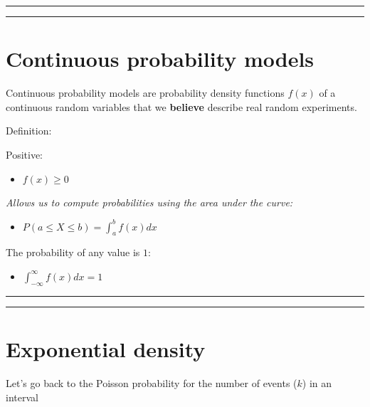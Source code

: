 \documentclass[
]{book}
\providecommand{\tightlist}{%
  \setlength{\itemsep}{0pt}\setlength{\parskip}{0pt}}
\begin{document}
\begin{center}\rule{0.5\linewidth}{0.5pt}\end{center}

\begin{center}\rule{0.5\linewidth}{0.5pt}\end{center}

\hypertarget{continuous-probability-models}{%
\section{Continuous probability models}\label{continuous-probability-models}}

Continuous probability models are probability density functions \(f(x)\) of a continuous random variables that we \textbf{believe} describe real random experiments.

Definition:

Positive:

\begin{itemize}
\tightlist
\item
  \(f(x) \geq 0\)
\end{itemize}

\emph{Allows us to compute probabilities using the area under the curve:}

\begin{itemize}
\tightlist
\item
  \(P(a\leq X \leq b)=\int_{a}^{b} f(x) dx\)
\end{itemize}

The probability of any value is \(1\):

\begin{itemize}
\tightlist
\item
  \(\int_{-\infty}^{\infty} f(x) dx = 1\)
\end{itemize}

\begin{center}\rule{0.5\linewidth}{0.5pt}\end{center}

\begin{center}\rule{0.5\linewidth}{0.5pt}\end{center}

\hypertarget{exponential-density}{%
\section{Exponential density}\label{exponential-density}}

Let's go back to the Poisson probability for the number of events (\(k\)) in an interval
\end{document}
